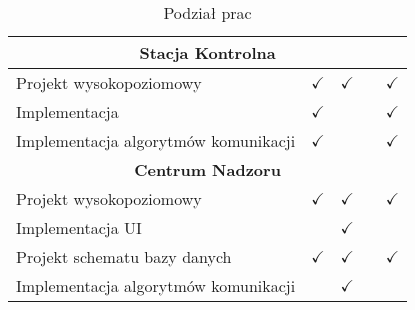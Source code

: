 \begin{table}[b]
\begin{tabular}{|m{6cm}|c|c|c|c|}
		\\\hline
		\multicolumn{5}{|c|}{\bfseries Stacja Kontrolna} \\\hline
		Projekt wysokopoziomowy & $\checkmark$ & $\checkmark$ & & $\checkmark$
		\\\hline
		Implementacja & $\checkmark$ & & & $\checkmark$ \\\hline
		Implementacja algorytmów komunikacji & $\checkmark$ & & & $\checkmark$
		\\\hline
		\multicolumn{5}{|c|}{\bfseries Centrum Nadzoru} \\\hline
		Projekt wysokopoziomowy &		$\checkmark$ & $\checkmark$ & & $\checkmark$
		\\\hline
		Implementacja UI & & $\checkmark$ & & \\\hline
		Projekt schematu bazy danych & $\checkmark$ & $\checkmark$ & & $\checkmark$
		\\\hline
		Implementacja algorytmów komunikacji & & $\checkmark$ & & \\\hline
	\end{tabular}
	\caption{Podział prac}
	\label{tab:Podzial}
\end{table}
